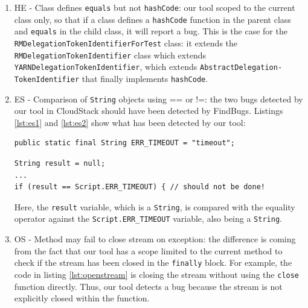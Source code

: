 \documentclass[sigconf]{acmart}
\begin{document}
\begin{enumerate}
    \item HE - Class defines \texttt{equals} but not \texttt{hashCode}: our tool scoped to the current class only, so that if a class defines a \texttt{hashCode} function in the parent class and \texttt{equals} in the child class, it will report a bug. This is the case for the \texttt{RMDelegationToken\-IdentifierForTest} class: it extends the \texttt{RMDelegation\-TokenIdentifier} class which extends \texttt{YARNDelegation\-TokenIdentifier}, which extends \texttt{AbstractDelegation-}\newline\texttt{TokenIdentifier} that finally implements \texttt{hashCode}.
    \item ES - Comparison of \texttt{String} objects using == or !=: the two bugs detected by our tool in CloudStack should have been detected by FindBugs. Listings \ref{lst:es1} and \ref{lst:es2} show what has been detected by our tool:
\begin{lstlisting}[caption={Excerpt from the \texttt{Script} class, definition of the \texttt{ERR\_TIMEOUT} attribute},captionpos=b,label={lst:es1}]
public static final String ERR_TIMEOUT = "timeout";
\end{lstlisting}
\vspace{-5mm}
\begin{lstlisting}[caption={Excerpt from the \texttt{KVMHABase} class, method \texttt{runScriptRetry} in the CloudStack hypervisors KVM plugin},captionpos=b,label={lst:es2}]
String result = null;
...
if (result == Script.ERR_TIMEOUT) { // should not be done!
\end{lstlisting}
\vspace{-3mm}
Here, the \texttt{result} variable, which is a \texttt{String}, is compared with the equality operator against the \texttt{Script.ERR\_TIMEOUT} variable, also being a \texttt{String}.
    \item OS - Method may fail to close stream on exception: the difference is coming from the fact that our tool has a scope limited to the current method to check if the stream has been closed in the \texttt{finally} block. For example, the code in listing \ref{lst:openstream} is closing the stream without using the \texttt{close} function directly. Thus, our tool detects a bug because the stream is not explicitly closed within the function.
\begin{lstlisting}[caption={Excerpt from the \texttt{DebugAdmin} class, method \texttt{run} in the Hadoop HDFS project},captionpos=b,label={lst:openstream}]

\end{lstlisting}
\end{enumerate}
\end{document}
